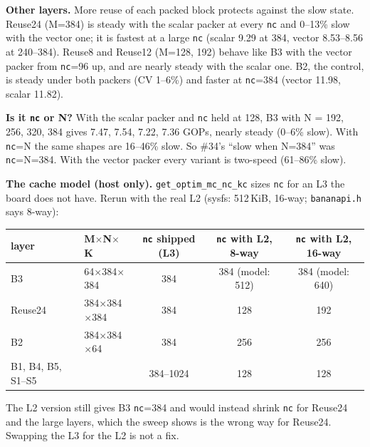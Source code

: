 \documentclass[10pt,a4paper]{article}
\begin{document}
\textbf{Other layers.} More reuse of each packed block protects against the slow state. Reuse24 (M=384) is steady
with the scalar packer at every \texttt{nc} and 0--13\% slow with the vector one; it is fastest at a large
\texttt{nc} (scalar 9.29 at 384, vector 8.53--8.56 at 240--384). Reuse8 and Reuse12 (M=128, 192) behave like B3
with the vector packer from \texttt{nc}=96 up, and are nearly steady with the scalar one. B2, the control, is
steady under both packers (CV 1--6\%) and faster at \texttt{nc}=384 (vector 11.98, scalar 11.82).

\textbf{Is it \texttt{nc} or N?} With the scalar packer and \texttt{nc} held at 128, B3 with N = 192, 256, 320,
384 gives 7.47, 7.54, 7.22, 7.36 GOPs, nearly steady (0--6\% slow). With \texttt{nc}=N the same shapes are 16--46\%
slow. So \#34's ``slow when N=384'' was \texttt{nc}=N=384. With the vector packer every variant is two-speed
(61--86\% slow).

\textbf{The cache model (host only).} \texttt{get\_optim\_mc\_nc\_kc} sizes \texttt{nc} for an L3 the board does
not have. Rerun with the real L2 (sysfs: 512\,KiB, 16-way; \texttt{bananapi.h} says 8-way):

\begin{center}\small
\begin{tabular}{llccc}
\toprule
layer & M$\times$N$\times$K & \texttt{nc} shipped (L3) & \texttt{nc} with L2, 8-way & \texttt{nc} with L2, 16-way \\
\midrule
B3 & 64$\times$384$\times$384 & 384 & 384 (model: 512) & 384 (model: 640) \\
Reuse24 & 384$\times$384$\times$384 & 384 & 128 & 192 \\
B2 & 384$\times$384$\times$64 & 384 & 256 & 256 \\
B1, B4, B5, S1--S5 & & 384--1024 & 128 & 128 \\
\bottomrule
\end{tabular}
\end{center}
The L2 version still gives B3 \texttt{nc}=384 and would instead shrink \texttt{nc} for Reuse24 and the large
layers, which the sweep shows is the wrong way for Reuse24. Swapping the L3 for the L2 is not a fix.
\end{document}
